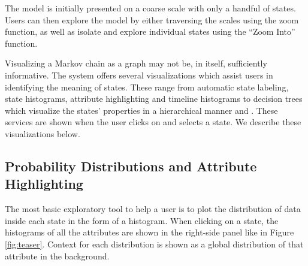 The model is initially presented on a coarse scale with only a handful
of states. Users can then explore the model by either traversing the scales using the zoom 
function, as well as isolate and explore individual states using the ``Zoom Into'' function. %

Visualizing a Markov chain as a graph may not be, in itself,  sufficiently informative. The system offers several 
visualizations which assist users in identifying the meaning of states. These range from automatic
state labeling, state histograms, attribute highlighting and timeline histograms to decision trees
which visualize the states' properties in a hierarchical manner and .
These services are shown when the user clicks on and selects a state. We describe these visualizations below.  




\subsection{Probability Distributions and Attribute Highlighting}

The most basic exploratory tool to help a user is to plot the distribution of data inside each state in the form of a histogram. When clicking on a state, the histograms of all the attributes are shown in the right-side panel like in Figure \ref{fig:teaser}. Context for each distribution is shown as a global distribution of that attribute in the background.

